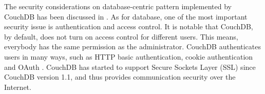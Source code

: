 The security considerations on database-centric pattern implemented by CouchDB has been discussed in \cite{francesco2012storage}. As for database, one of the most important security issue is authentication and access control. It is notable that CouchDB, by default, does not turn on access control for different users. This means, everybody has the same permission as the administrator. CouchDB authenticates users in many ways, such as HTTP basic authentication, cookie authentication and OAuth \cite{hammer2010oauth}. CouchDB has started to support Secure Sockets Layer (SSL) since CouchDB version 1.1, and thus provides communication security over the Internet.